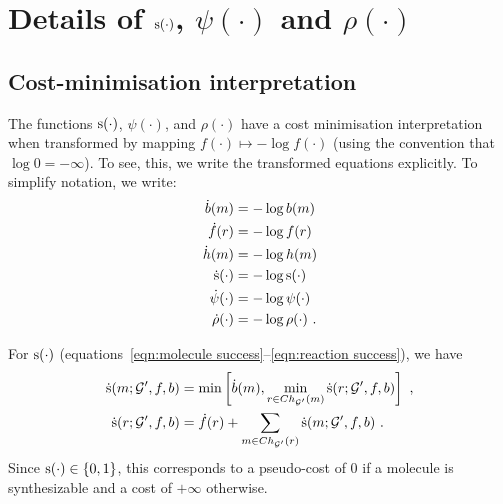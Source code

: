 \section{Details of \texorpdfstring{${\textnormal{s}}(\cdot)$, $\psi(\cdot)$ and $\rho(\cdot)$}{s, ψ and ρ}}
\label{appendix:rfbd:s,psi,rho}

\subsection{
    Cost-minimisation interpretation
}
\label{appendix:s,psi,rho min cost}

The functions ${\textnormal{s}}(\cdot)$, $\psi(\cdot)$, and $\rho(\cdot)$
have a cost minimisation interpretation
when transformed by
mapping $f(\cdot)\mapsto-\log{f(\cdot)}$
(using the convention that $\log{0}=-\infty$).
To see, this, we write the transformed equations explicitly.
To simplify notation, we write:
\begin{align}
    \dot b (m) &= -\log{b(m)} \\
    \dot f (r) &= -\log{f(r)} \\
    \dot h (m) &= -\log{h(m)}  \\
    \dot {{\textnormal{s}}} (\cdot) &= -\log{{\textnormal{s}}(\cdot)}  \\
    \dot \psi (\cdot) &= -\log{\psi(\cdot)}  \\
    \dot \rho (\cdot) &= -\log{\rho(\cdot)} \ . 
\end{align}

For ${\textnormal{s}}(\cdot)$ (equations~\ref{eqn:molecule success}--\ref{eqn:reaction success}),
we have
\begin{align}
    \dot{{\textnormal{s}}}(m;{\mathcal{G}}',f,b) &= 
        \min\left[
            \dot b(m),
            \min_{r\in Ch_{{\mathcal{G}}'}(m)}\dot{{\textnormal{s}}}(r;{\mathcal{G}}',f,b)
        \right]\ , \\
    \dot{{\textnormal{s}}}(r;{\mathcal{G}}',f,b) &=
        \dot f(r)
        + \sum_{m\in Ch_{{\mathcal{G}}'}(r)}
            \dot{{\textnormal{s}}}(m;{\mathcal{G}}',f,b)
    \ . 
\end{align}
Since ${\textnormal{s}}(\cdot)\in\{0, 1\}$,
this corresponds to a pseudo-cost of $0$ if a molecule is synthesizable
and a cost of $+\infty$ otherwise.

